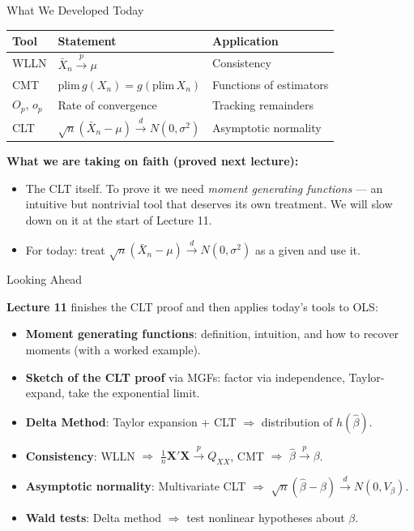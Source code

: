 \documentclass[handout, aspectratio=169]{beamer}
\numberwithin{equation}{section}
\begin{document}
\begin{frame}{What We Developed Today}

\begin{center}
\renewcommand{\arraystretch}{1.3}
\begin{tabular}{lll}
\toprule
\textbf{Tool} & \textbf{Statement} & \textbf{Application} \\
\midrule
WLLN & $\bar{X}_n \overset{p}{\to} \mu$ & Consistency \\
CMT & $\text{plim}\, g(X_n) = g(\text{plim}\, X_n)$ & Functions of estimators \\
$O_p$, $o_p$ & Rate of convergence & Tracking remainders \\
CLT & $\sqrt{n}(\bar{X}_n - \mu) \overset{d}{\to} N(0,\sigma^2)$ & Asymptotic normality \\
\bottomrule
\end{tabular}
\renewcommand{\arraystretch}{1.0}
\end{center}

\pause

\textbf{What we are taking on faith (proved next lecture):}
\begin{itemize}
\item The CLT itself. To prove it we need \emph{moment generating functions} --- an intuitive but nontrivial tool that deserves its own treatment. We will slow down on it at the start of Lecture 11.
\item For today: treat $\sqrt n(\bar X_n - \mu) \overset{d}{\to} N(0,\sigma^2)$ as a given and use it.
\end{itemize}

\end{frame}


\begin{frame}{Looking Ahead}

\textbf{Lecture 11} finishes the CLT proof and then applies today's tools to OLS:
\begin{itemize}
    \item \textbf{Moment generating functions}: definition, intuition, and how to recover moments (with a worked example).
    \item \textbf{Sketch of the CLT proof} via MGFs: factor via independence, Taylor-expand, take the exponential limit.
    \item \textbf{Delta Method}: Taylor expansion + CLT $\Rightarrow$ distribution of $h(\hat\beta)$.
    \item \textbf{Consistency}: WLLN $\Rightarrow$ $\frac{1}{n}\bm{X'X} \overset{p}{\to} Q_{XX}$, CMT $\Rightarrow$ $\hat\beta \overset{p}{\to} \beta$.
    \item \textbf{Asymptotic normality}: Multivariate CLT $\Rightarrow$ $\sqrt{n}(\hat\beta - \beta) \overset{d}{\to} N(0, V_\beta)$.
    \item \textbf{Wald tests}: Delta method $\Rightarrow$ test nonlinear hypotheses about $\beta$.
\end{itemize}

\end{frame}
\end{document}

